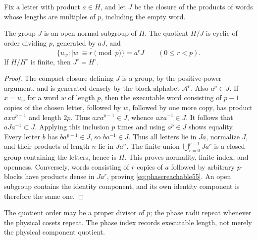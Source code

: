 Fix a letter with product $a\in H$, and let $J$ be the closure of the products of words whose lengths are multiples of $p$, including the empty word.
\begin{lemma}\label{lem:phasegroup55}
The group $J$ is an open normal subgroup of $H$. The quotient $H/J$ is cyclic of order dividing $p$, generated by $aJ$, and
\begin{equation}\label{eq:phasereachable55}
 \overline{\{u_w:|w|\equiv r\pmod p\}}=a^rJ
 \qquad(0\le r<p).
\end{equation}
If $H/H^\circ$ is finite, then $J^\circ=H^\circ$.
\end{lemma}
\begin{proof}
The compact closure defining $J$ is a group, by the positive-power argument, and is generated densely by the block alphabet $\mathcal A^p$. Also $a^p\in J$. If $x=u_w$ for a word $w$ of length $p$, then the executable word consisting of $p-1$ copies of the chosen letter, followed by $w$, followed by one more copy, has product $axa^{p-1}$ and length $2p$. Thus $axa^{p-1}\in J$, whence $axa^{-1}\in J$. It follows that $aJa^{-1}\subset J$. Applying this inclusion $p$ times and using $a^p\in J$ shows equality. Every letter $b$ has $ba^{p-1}\in J$, so $ba^{-1}\in J$. Thus all letters lie in $Ja$, normalize $J$, and their products of length $n$ lie in $Ja^n$. The finite union $\bigcup_{r=0}^{p-1}Ja^r$ is a closed group containing the letters, hence is $H$. This proves normality, finite index, and openness. Conversely, words consisting of $r$ copies of $a$ followed by arbitrary $p$-blocks have products dense in $Ja^r$, proving \eqref{eq:phasereachable55}. An open subgroup contains the identity component, and its own identity component is therefore the same one.
\end{proof}
The quotient order may be a proper divisor of $p$; the phase radii repeat whenever the physical cosets repeat. The phase index records executable length, not merely the physical component quotient.

